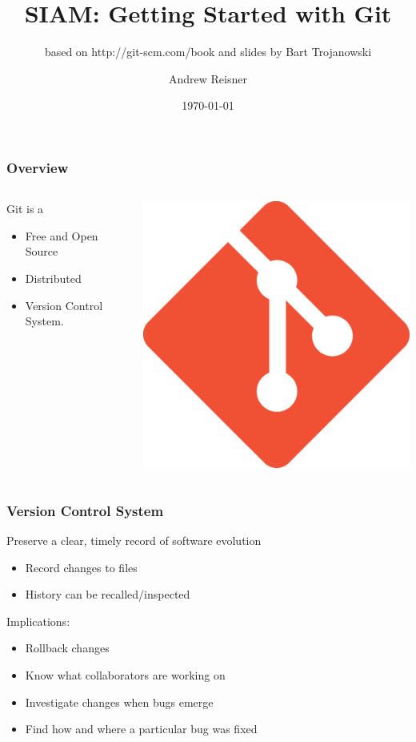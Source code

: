 \documentclass[english,compress]{beamer}
\title{SIAM: Getting Started with Git}
\subtitle{based on http://git-scm.com/book and slides by Bart Trojanowski}
\author{Andrew Reisner}
\date{\today}
\begin{document}
\frame{\titlepage}

\frame
{
    \frametitle{Overview}
    \begin{columns}
    \begin{column}{.5\textwidth}
        Git is a
        \begin{itemize}
            \item Free and Open Source
            \item Distributed
            \item Version Control System.
        \end{itemize}
    \end{column}
    \begin{column}{.5\textwidth}
        \begin{center}
            \includegraphics[width=.7\textwidth]{figs/git-logo.png} 
        \end{center}
    \end{column}
    \end{columns}
}

\frame
{
    \frametitle{Version Control System}

        Preserve a clear, timely record of software evolution
            \begin{itemize}
                \item Record changes to files
                \item History can be recalled/inspected
            \end{itemize}
        Implications:
            \begin{itemize}
                \item Rollback changes
                \item Know what collaborators are working on
                \item Investigate changes when bugs emerge
                \item Find how and where a particular bug was fixed
            \end{itemize}
}
\end{document}
